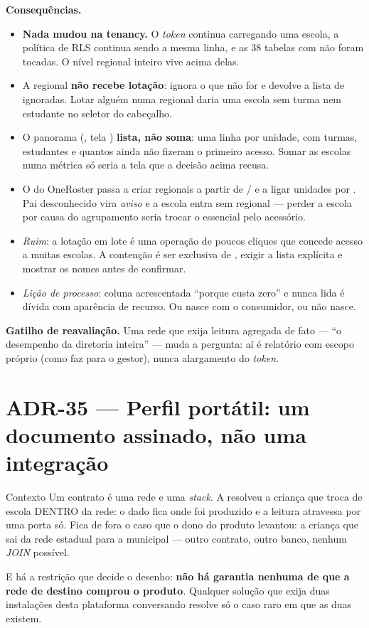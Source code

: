 \textbf{Consequências.}
\begin{itemize}
  \item \textbf{Nada mudou na tenancy.} O \emph{token} continua carregando uma
    escola, a política de RLS continua sendo a mesma linha, e as 38 tabelas com
     não foram tocadas. O nível regional inteiro vive acima delas.
  \item A regional \textbf{não recebe lotação}:  ignora o que não
    for  e devolve a lista de ignoradas. Lotar alguém numa
    regional daria uma escola sem turma nem estudante no seletor do cabeçalho.
  \item O panorama (, tela
    ) \textbf{lista, não soma}: uma linha por unidade,
    com turmas, estudantes e quantos ainda não fizeram o primeiro acesso. Somar as
    escolas numa métrica só seria a tela que a decisão acima recusa.
  \item O  do OneRoster passa a criar regionais a partir de
    / e a ligar unidades por . Pai
    desconhecido vira \emph{aviso} e a escola entra sem regional --- perder a
    escola por causa do agrupamento seria trocar o essencial pelo acessório.
  \item \emph{Ruim}: a lotação em lote é uma operação de poucos cliques que
    concede acesso a muitas escolas. A contenção é ser exclusiva de
    , exigir a lista explícita e mostrar os nomes antes de
    confirmar.
  \item \emph{Lição de processo}: coluna acrescentada \enquote{porque custa zero}
    e nunca lida é dívida com aparência de recurso. Ou nasce com o consumidor,
    ou não nasce.
\end{itemize}

\textbf{Gatilho de reavaliação.} Uma rede que exija leitura agregada de fato
--- \enquote{o desempenho da diretoria inteira} --- muda a pergunta: aí é
relatório com escopo próprio (como  faz para o gestor),
nunca alargamento do \emph{token}.

\section{ADR-35 --- Perfil portátil: um documento assinado, não uma integração}
\label{adr:perfil-portatil}

\begin{especificacao}{Contexto}
Um contrato é uma rede e uma \emph{stack}. A  resolveu a criança
que troca de escola DENTRO da rede: o dado fica onde foi produzido e a leitura
atravessa por uma porta só. Fica de fora o caso que o dono do produto levantou:
a criança que sai da rede estadual para a municipal --- outro contrato, outro
banco, nenhum \emph{JOIN} possível.

E há a restrição que decide o desenho: \textbf{não há garantia nenhuma de que a
rede de destino comprou o produto}. Qualquer solução que exija duas instalações
desta plataforma conversando resolve só o caso raro em que as duas existem.
\end{especificacao}

